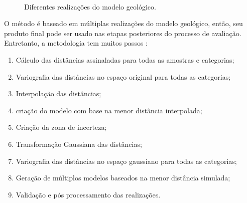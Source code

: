 \begin{figure}[H]
\caption{Diferentes realizações do modelo geológico.} 
\label{dif_real}
\begin{center}
\\
\end{center}
\begin{center}
\end{center}
\end{figure}

O método é baseado em múltiplas realizações do modelo geológico, então, seu produto final pode ser usado nas etapas posteriores do processo de avaliação. Entretanto, a metodologia tem muitos passos \cite{radtke_dissertacao}:

\begin{enumerate}
\item Cálculo das distâncias assinaladas para todas as amostras e categorias;
\item Variografia das distâncias no espaço original para todas as categorias;
\item Interpolação das distâncias; 
\item criação do modelo com base na menor distância interpolada;
\item Criação da zona de incerteza;
\item Transformação Gaussiana das distâncias;
\item Variografia das distâncias no espaço gaussiano para todas as categorias;
\item Geração de múltiplos modelos baseados na menor distância simulada;
\item Validação e pós processamento das realizações.
\end{enumerate}

